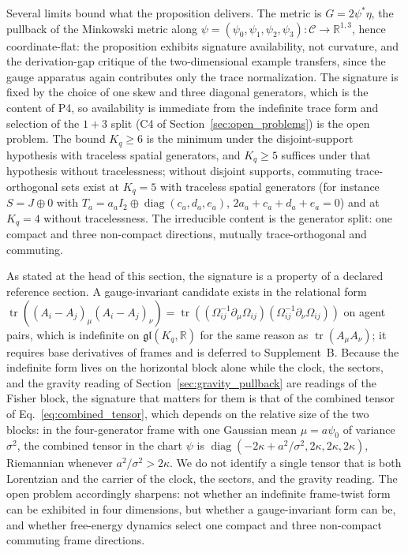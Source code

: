 \documentclass[11pt]{article}
\begin{document}
Several limits bound what the proposition delivers. The metric is $G = 2\psi^*\eta$, the pullback of the Minkowski metric along $\psi = (\psi_0, \psi_1, \psi_2, \psi_3): \mathcal{C} \to \mathbb{R}^{1,3}$, hence coordinate-flat: the proposition exhibits signature availability, not curvature, and the derivation-gap critique of the two-dimensional example transfers, since the gauge apparatus again contributes only the trace normalization. The signature is fixed by the choice of one skew and three diagonal generators, which is the content of P4, so availability is immediate from the indefinite trace form and selection of the $1{+}3$ split (C4 of Section~\ref{sec:open_problems}) is the open problem. The bound $K_q \geq 6$ is the minimum under the disjoint-support hypothesis with traceless spatial generators, and $K_q \geq 5$ suffices under that hypothesis without tracelessness; without disjoint supports, commuting trace-orthogonal sets exist at $K_q = 5$ with traceless spatial generators (for instance $S = J \oplus 0$ with $T_a = a_a I_2 \oplus \operatorname{diag}(c_a, d_a, e_a)$, $2a_a + c_a + d_a + e_a = 0$) and at $K_q = 4$ without tracelessness. The irreducible content is the generator split: one compact and three non-compact directions, mutually trace-orthogonal and commuting.

As stated at the head of this section, the signature is a property of a declared reference section. A gauge-invariant candidate exists in the relational form $\operatorname{tr}((A_i - A_j)_\mu(A_i - A_j)_\nu) = \operatorname{tr}((\Omega_{ij}^{-1}\partial_\mu\Omega_{ij})(\Omega_{ij}^{-1}\partial_\nu\Omega_{ij}))$ on agent pairs, which is indefinite on $\mathfrak{gl}(K_q,\mathbb{R})$ for the same reason as $\operatorname{tr}(A_\mu A_\nu)$; it requires base derivatives of frames and is deferred to Supplement~B. Because the indefinite form lives on the horizontal block alone while the clock, the sectors, and the gravity reading of Section~\ref{sec:gravity_pullback} are readings of the Fisher block, the signature that matters for them is that of the combined tensor of Eq.~\eqref{eq:combined_tensor}, which depends on the relative size of the two blocks: in the four-generator frame with one Gaussian mean $\mu = a\psi_0$ of variance $\sigma^2$, the combined tensor in the chart $\psi$ is $\operatorname{diag}(-2\kappa + a^2/\sigma^2, 2\kappa, 2\kappa, 2\kappa)$, Riemannian whenever $a^2/\sigma^2 > 2\kappa$. We do not identify a single tensor that is both Lorentzian and the carrier of the clock, the sectors, and the gravity reading. The open problem accordingly sharpens: not whether an indefinite frame-twist form can be exhibited in four dimensions, but whether a gauge-invariant form can be, and whether free-energy dynamics select one compact and three non-compact commuting frame directions.
\end{document}
